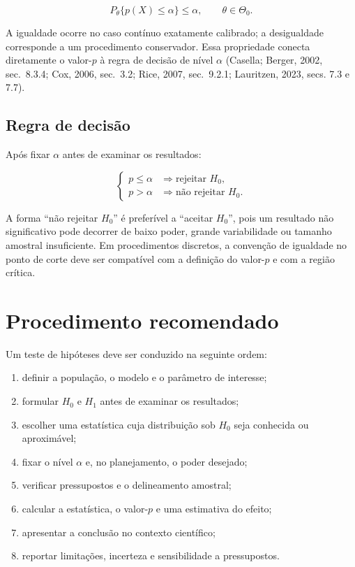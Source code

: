 \documentclass[
  letterpaper,
  DIV=11,
  numbers=noendperiod]{scrreprt}
\providecommand{\tightlist}{%
  \setlength{\itemsep}{0pt}\setlength{\parskip}{0pt}}\usepackage{longtable,booktabs,array}
\begin{document}
\[P_\theta\{p(X)\leq\alpha\}\leq\alpha,
\qquad \theta\in\Theta_0.\]

A igualdade ocorre no caso contínuo exatamente calibrado; a desigualdade
corresponde a um procedimento conservador. Essa propriedade conecta
diretamente o valor-\(p\) à regra de decisão de nível \(\alpha\)
(Casella; Berger, 2002, sec.~8.3.4; Cox, 2006, sec.~3.2; Rice, 2007,
sec.~9.2.1; Lauritzen, 2023, secs. 7.3 e 7.7).

\subsection{Regra de decisão}\label{regra-de-decisuxe3o}

Após fixar \(\alpha\) antes de examinar os resultados:

\[\begin{cases}
p\leq\alpha &\Longrightarrow \text{rejeitar }H_0,\\
p>\alpha &\Longrightarrow \text{não rejeitar }H_0.
\end{cases}\]

A forma ``não rejeitar \(H_0\)'' é preferível a ``aceitar \(H_0\)'',
pois um resultado não significativo pode decorrer de baixo poder, grande
variabilidade ou tamanho amostral insuficiente. Em procedimentos
discretos, a convenção de igualdade no ponto de corte deve ser
compatível com a definição do valor-\(p\) e com a região crítica.

\section{Procedimento recomendado}\label{procedimento-recomendado}

Um teste de hipóteses deve ser conduzido na seguinte ordem:

\begin{enumerate}
\def\labelenumi{\arabic{enumi}.}
\tightlist
\item
  definir a população, o modelo e o parâmetro de interesse;
\item
  formular \(H_0\) e \(H_1\) antes de examinar os resultados;
\item
  escolher uma estatística cuja distribuição sob \(H_0\) seja conhecida
  ou aproximável;
\item
  fixar o nível \(\alpha\) e, no planejamento, o poder desejado;
\item
  verificar pressupostos e o delineamento amostral;
\item
  calcular a estatística, o valor-\(p\) e uma estimativa do efeito;
\item
  apresentar a conclusão no contexto científico;
\item
  reportar limitações, incerteza e sensibilidade a pressupostos.
\end{enumerate}
\end{document}
